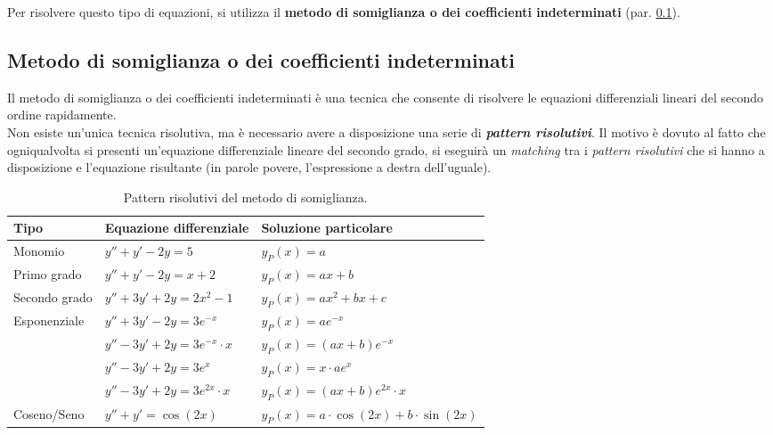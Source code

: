 \documentclass[a4paper]{article}
\begin{document}
	\noindent
	Per risolvere questo tipo di equazioni, si utilizza il \textbf{metodo di somiglianza o dei coefficienti indeterminati} (par. \ref{subsection: metodo di somiglianza o dei coefficienti indeterminati}).\newpage

	\subsection{Metodo di somiglianza o dei coefficienti indeterminati}\label{subsection: metodo di somiglianza o dei coefficienti indeterminati}
	Il metodo di somiglianza o dei coefficienti indeterminati è una tecnica che consente di risolvere le equazioni differenziali lineari del secondo ordine rapidamente.\\

	\noindent
	Non esiste un'unica tecnica risolutiva, ma è necessario avere a disposizione una serie di \textbf{\emph{pattern risolutivi}}. Il motivo è dovuto al fatto che ogniqualvolta si presenti un'equazione differenziale lineare del secondo grado, si eseguirà un \emph{matching} tra i \emph{pattern risolutivi} che si hanno a disposizione e l'equazione risultante (in parole povere, l'espressione a destra dell'uguale).\newline

	\begin{table}[!htp]
		\centering
		\begin{tabular}{@{} l l l @{}}
			\toprule
			\textbf{Tipo}	& \textbf{Equazione differenziale} & \textbf{Soluzione particolare} \\
			\midrule
			Monomio	& $y'' + y' - 2y = 5$ & $y_{P}\left(x\right) = a$ \\
			\cmidrule{1-3}
			Primo grado 	& $y'' + y' - 2y = x + 2$ & $y_{P}\left(x\right) = ax + b$ \\ 
			\cmidrule{1-3} 
			Secondo grado	& $y'' + 3y' + 2y = 2x^{2} - 1$ & $y_{P}\left(x\right) = ax^{2} + bx + c$ \\
			\cmidrule{1-3} 
			\multirow{4}{*}{Esponenziale} 	& $y'' + 3y' - 2y = 3e^{-x}$	& $y_{P}\left(x\right) = ae^{-x}$ \\ [.3em]
			& $y'' - 3y' + 2y = 3e^{-x} \cdot x$	& $y_{P}\left(x\right) = \left(ax + b\right) e^{-x}$ \\ [.3em]
			& $y'' - 3y' + 2y = 3e^{x}$	& $y_{P}\left(x\right) = x \cdot ae^{x}$ \\ [.3em]
			& $y'' - 3y' + 2y = 3e^{2x} \cdot x$	& $y_{P}\left(x\right) = \left(ax + b\right) e^{2x} \cdot x$ \\
			\cmidrule{1-3}
			Coseno/Seno 	& $y'' + y' = \cos\left(2x\right)$ & $y_{P}\left(x\right) = a \cdot \cos\left(2x\right) + b \cdot \sin\left(2x\right)$ \\
			\bottomrule
		\end{tabular}
		\caption{Pattern risolutivi del metodo di somiglianza.}
		\label{tab: pattern risolutivi del metodo di somiglianza}
	\end{table}
\end{document}
